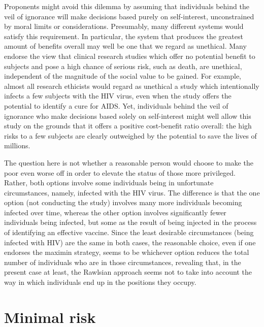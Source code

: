 \documentclass[12p]{article}
\begin{document}
Proponents might avoid this dilemma by assuming that individuals behind the veil of ignorance will make decisions based purely on self-interest, unconstrained by moral limits or considerations. Presumably, many different systems would satisfy this requirement. In particular, the system that produces the greatest amount of benefits overall may well be one that we regard as unethical. Many endorse the view that clinical research studies which offer no potential benefit to subjects and pose a high chance of serious risk, such as death, are unethical, independent of the magnitude of the social value to be gained. For example, almost all research ethicists would regard as unethical a study which intentionally infects a few subjects with the HIV virus, even when the study offers the potential to identify a cure for AIDS. Yet, individuals behind the veil of ignorance who make decisions based solely on self-interest might well allow this study on the grounds that it offers a positive cost-benefit ratio overall: the high risks to a few subjects are clearly outweighed by the potential to save the lives of millions.

The question here is not whether a reasonable person would choose to make the poor even worse off in order to elevate the status of those more privileged. Rather, both options involve some individuals being in unfortunate circumstances, namely, infected with the HIV virus. The difference is that the one option (not conducting the study) involves many more individuals becoming infected over time, whereas the other option involves significantly fewer individuals being infected, but some as the result of being injected in the process of identifying an effective vaccine. Since the least desirable circumstances (being infected with HIV) are the same in both cases, the reasonable choice, even if one endorses the maximin strategy, seems to be whichever option reduces the total number of individuals who are in those circumstances, revealing that, in the present case at least, the Rawlsian approach seems not to take into account the way in which individuals end up in the positions they occupy.


\section{Minimal risk}
\end{document}
